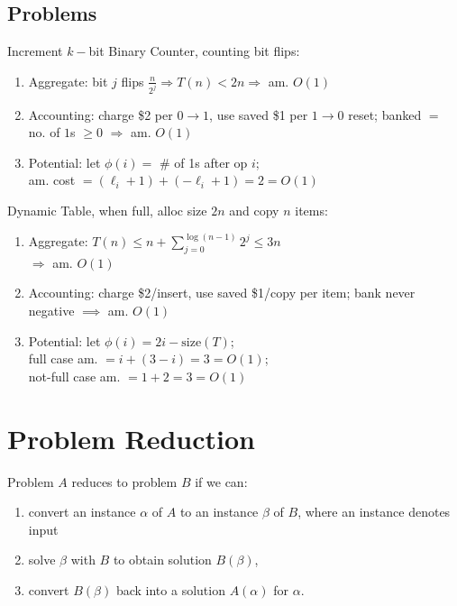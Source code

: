 \documentclass[12pt, a4paper]{article}
\begin{document}
\begin{multicols*}{3}
\subsection{Problems}

Increment $k-$bit Binary Counter, counting bit flips:
\begin{enumerate}[\roman*.]
  \item Aggregate: bit $j$ flips $\frac{n}{2^j} \Rightarrow T(n)<2n \Rightarrow$ am. $O(1)$
  \item Accounting: charge \$2 per $0\!\to\!1$, use saved \$1 per $1\!\to\!0$ reset; banked $=$ no. of $1$s $\geq 0$ $\Rightarrow$ am. $O(1)$
  \item Potential: let $\phi(i)=$ \# of 1s after op $i$;\\ am. cost $=(\ell_i+1)+(-\ell_i+1)=2 = O(1)$
\end{enumerate}

Dynamic Table, when full, alloc size $2n$ and copy $n$ items:
\begin{enumerate}[\roman*.]
  \item Aggregate: $T(n) \leq n + \sum^{\log(n-1)}_{j=0}2^j \leq 3n$\\$\Rightarrow$ am. $O(1)$
  \item Accounting: charge \$2/insert, use saved \$1/copy per item; bank never negative $\implies$ am. $O(1)$
  \item Potential: let $\phi(i)=2i-\mathrm{size}(T)$;\\ full case am. $= i + (3-i) = 3 = O(1)$;\\ not-full case am. $= 1 + 2 = 3 = O(1)$
\end{enumerate}

\colbreak
\section{Problem Reduction}

Problem $A$ reduces to problem $B$ if we can:  
\begin{enumerate}[\arabic*.]
  \item convert an instance $\alpha$ of $A$ to an instance $\beta$ of $B$, where an instance denotes input 
  \item solve $\beta$ with $B$ to obtain solution $B(\beta)$,  
  \item convert $B(\beta)$ back into a solution $A(\alpha)$ for $\alpha$.  
\end{enumerate}


\end{multicols*}
\end{document}
